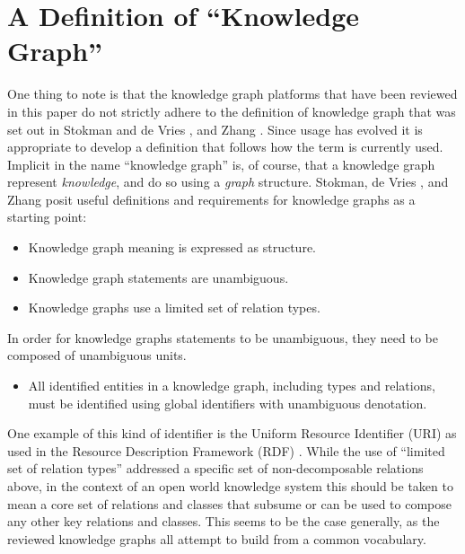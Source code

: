 \documentclass[runningheads,a4paper]{llncs}
\begin{document}
\section{A Definition of ``Knowledge Graph''}

One thing to note is that the knowledge graph platforms that have been reviewed in this paper do not strictly adhere to the definition of knowledge graph that was set out in Stokman and de Vries \cite{Stokman_1988}, and Zhang \cite{zhang2002knowledge}.
Since usage has evolved it is appropriate to develop a definition that follows how the term is currently used.
Implicit in the name ``knowledge graph'' is, of course, that a knowledge graph represent \emph{knowledge}, and do so using a \emph{graph} structure.
Stokman,  de Vries \cite{Stokman_1988}, and Zhang \cite{zhang2002knowledge} posit useful definitions and requirements for knowledge graphs as a starting point:

\begin {itemize}
\item Knowledge graph meaning is expressed as structure.
\item Knowledge graph statements are unambiguous.
\item Knowledge graphs use a limited set of relation types.
\end {itemize}

In order for knowledge graphs statements to be unambiguous, they need to be composed of unambiguous units. 
\begin {itemize}
\item All identified entities in a knowledge graph, including types and relations, must be identified using global identifiers with unambiguous denotation.
\end {itemize}
One example of this kind of identifier is the Uniform Resource Identifier (URI) as used in the Resource Description Framework (RDF) \cite{cyganiak2014rdf}.
While the use of ``limited set of relation types'' addressed a specific set of non-decomposable relations above, in the context of an open world knowledge system this should be taken to mean a core set of relations and classes that subsume or can be used to compose any other key relations and classes.   
This seems to be the case generally, as the reviewed knowledge graphs all attempt to build from a common vocabulary.
\end{document}
